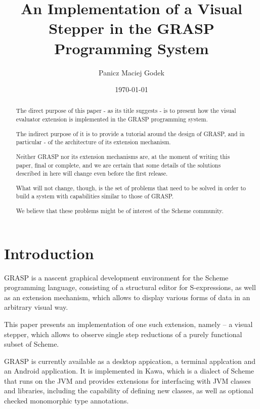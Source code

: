 \documentclass[acmsmall]{acmart}
\author{Panicz Maciej Godek}
\date{\today}
\title{An Implementation of a Visual Stepper in the GRASP Programming System}
\begin{document}

\begin{abstract}
The direct purpose of this paper - as its title suggests - is to
present how the visual evaluator extension is implemented in the GRASP
programming system.

The indirect purpose of it is to provide a tutorial around the design
of GRASP, and in particular - of the architecture of its extension
mechanism.

Neither GRASP nor its extension mechanisms are, at the moment of
writing this paper, final or complete, and we are certain that some
details of the solutions described in here will change even before the
first release.

What will not change, though, is the set of problems that need to be
solved in order to build a system with capabilities similar to those
of GRASP.

We believe that these problems might be of interest of the Scheme
community.

\end{abstract}

\maketitle



\section{Introduction}
\label{sec:org12c787a}

GRASP is a nascent graphical development environment for the Scheme
programming language, consisting of a structural editor for
S-expressions, as well as an extension mechanism, which allows to
display various forms of data in an arbitrary visual way.

This paper presents an implementation of one such extension, namely --
a visual stepper, which allows to observe single step reductions of a
purely functional subset of Scheme.

GRASP is currently available as a desktop appication, a terminal
applcation and an Android application.  It is implemented in Kawa,
which is a dialect of Scheme that runs on the JVM and provides
extensions for interfacing with JVM classes and libraries, including
the capability of defining new classes, as well as optional checked
monomorphic type annotations.
\end{document}
